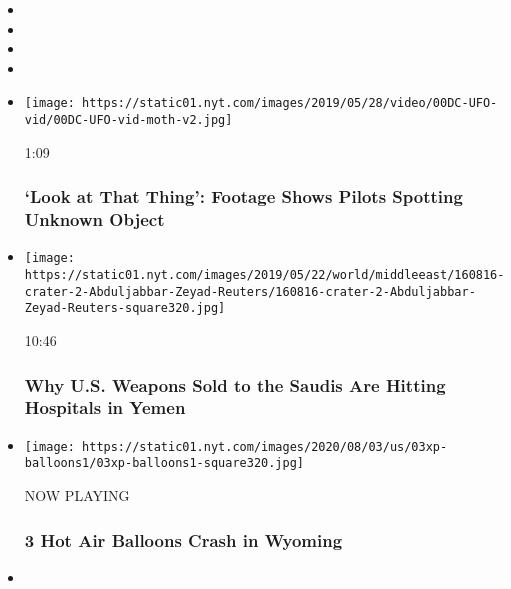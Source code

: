 \begin{itemize}
\item
\item
\item
\item
\end{itemize}

\begin{itemize}
\item
  \href{https://www.nytimes.com/video/us/100000006525294/ufo-video-navy.html?action=click\&module=video-series-bar\&region=header\&pgtype=Article\&playlistId=video/u-s}{}

  \texttt{[image: https://static01.nyt.com/images/2019/05/28/video/00DC-UFO-vid/00DC-UFO-vid-moth-v2.jpg]}

  1:09

  \hypertarget{look-at-that-thing-footage-shows-pilots-spotting-unknown-object}{%
  \subsubsection{`Look at That Thing': Footage Shows Pilots Spotting
  Unknown
  Object}\label{look-at-that-thing-footage-shows-pilots-spotting-unknown-object}}
\item
  \href{https://www.nytimes.com/video/world/middleeast/100000006466384/yemen-war-saudi-arabia-usa.html?action=click\&module=video-series-bar\&region=header\&pgtype=Article\&playlistId=video/u-s}{}

  \texttt{[image: https://static01.nyt.com/images/2019/05/22/world/middleeast/160816-crater-2-Abduljabbar-Zeyad-Reuters/160816-crater-2-Abduljabbar-Zeyad-Reuters-square320.jpg]}

  10:46

  \hypertarget{why-us-weapons-sold-to-the-saudis-are-hitting-hospitals-in-yemen}{%
  \subsubsection{Why U.S. Weapons Sold to the Saudis Are Hitting
  Hospitals in
  Yemen}\label{why-us-weapons-sold-to-the-saudis-are-hitting-hospitals-in-yemen}}
\item
  \texttt{[image: https://static01.nyt.com/images/2020/08/03/us/03xp-balloons1/03xp-balloons1-square320.jpg]}

  NOW PLAYING

  \hypertarget{3-hot-air-balloons-crash-in-wyoming-2}{%
  \subsubsection{3 Hot Air Balloons Crash in
  Wyoming}\label{3-hot-air-balloons-crash-in-wyoming-2}}
\item
  \href{https://www.nytimes.com/video/us/100000007271181/california-virus-cases-trend-down.html?action=click\&module=video-series-bar\&region=header\&pgtype=Article\&playlistId=video/u-s}{}


\end{itemize}
